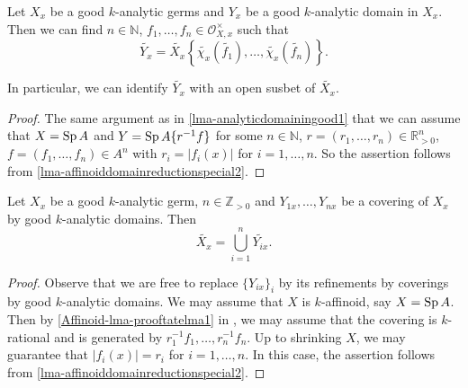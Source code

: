 \begin{lemma}\label{lma-goodaffinoiddomainredexp}
    Let $X_x$ be a good $k$-analytic germs and $Y_x$ be a good $k$-analytic domain in $X_x$. Then we can find $n\in \mathbb{N}$, $f_1,\ldots,f_n\in \mathcal{O}_{X,x}^{\times}$ such that
    \[
        \widetilde{Y_x}=  \widetilde{X_x}\left\{\widetilde{\chi_x}(\tilde{f_1}),\ldots,\widetilde{\chi_x}(\tilde{f_n})\right\}.
    \]
\end{lemma}

In particular, we can identify $\widetilde{Y_x}$ with an open susbet of $\widetilde{X_x}$. 

\begin{proof}
    The same argument as in \cref{lma-analyticdomainingood1} that we can assume that $X=\operatorname{Sp} A$ and $Y=\operatorname{Sp} A\{r^{-1}f\}$ for some $n\in \mathbb{N}$, $r=(r_1,\ldots,r_n)\in \mathbb{R}_{>0}^n$, $f=(f_1,\ldots,f_n)\in A^n$ with $r_i=|f_i(x)|$ for $i=1,\ldots,n$. So the assertion follows from \cref{lma-affinoiddomainreductionspecial2}.
\end{proof}

\begin{lemma}\label{lma-reductioncov}
    Let $X_x$ be a good $k$-analytic germ, $n\in \mathbb{Z}_{>0}$ and $Y_{1x},\ldots,Y_{nx}$ be a covering of $X_x$ by good $k$-analytic domains. Then 
    \[
        \widetilde{X_x}=\bigcup_{i=1}^n \widetilde{Y_{ix}}.  
    \]
\end{lemma}

\begin{proof}
    Observe that we are free to replace $\{Y_{ix}\}_i$ by its refinements by coverings by good $k$-analytic domains.  We may assume that $X$ is $k$-affinoid, say $X=\operatorname{Sp} A$. Then by \cref{Affinoid-lma-prooftatelma1} in , we may assume that the covering is $k$-rational and is generated by $r_1^{-1}f_1,\ldots,r_n^{-1}f_n$. Up to shrinking $X$, we may guarantee that $|f_i(x)|=r_i$ for $i=1,\ldots,n$.
    In this case, the assertion follows from \cref{lma-affinoiddomainreductionspecial2}.
\end{proof}

